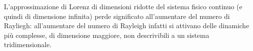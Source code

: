 \vspace{0.3cm}
\noindent
L'approssimazione di Lorenz di dimensioni ridotte del sistema fisico continuo (e quindi
 di dimensione infinita) perde significato all'aumentare del numero di Rayliegh: all'aumentare
 del numero di Rayleigh infatti si attivano delle dinamiche più complesse, di dimensione
 maggiore, non descrivibili a un sistema tridimensionale.


